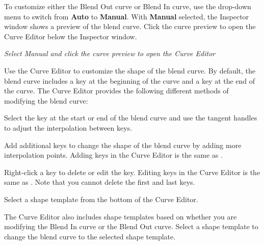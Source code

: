 To customize either the Blend Out curve or Blend In curve, use the drop-\/down menu to switch from {\bfseries{Auto}} to {\bfseries{Manual}}. With {\bfseries{Manual}} selected, the Inspector window shows a preview of the blend curve. Click the curve preview to open the Curve Editor below the Inspector window.



{\itshape Select Manual and click the curve preview to open the Curve Editor}

Use the Curve Editor to customize the shape of the blend curve. By default, the blend curve includes a key at the beginning of the curve and a key at the end of the curve. The Curve Editor provides the following different methods of modifying the blend curve\+:


\begin{DoxyItemize}
\item Select the key at the start or end of the blend curve and use the tangent handles to adjust the interpolation between keys.
\item Add additional keys to change the shape of the blend curve by adding more interpolation points. Adding keys in the Curve Editor is the same as .
\item Right-\/click a key to delete or edit the key. Editing keys in the Curve Editor is the same as . Note that you cannot delete the first and last keys.
\item Select a shape template from the bottom of the Curve Editor.
\end{DoxyItemize}

The Curve Editor also includes shape templates based on whether you are modifying the Blend In curve or the Blend Out curve. Select a shape template to change the blend curve to the selected shape template. 